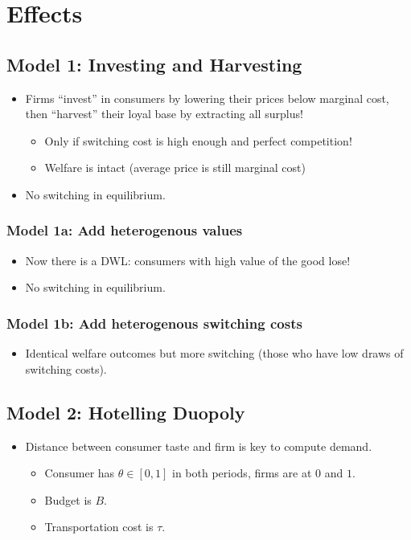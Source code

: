\section{Effects}

\subsection{Model 1: Investing and Harvesting}

\begin{itemize}
\item Firms ``invest'' in consumers by lowering their prices below marginal cost, then ``harvest'' their loyal base by extracting all surplus!
\begin{itemize}
\item Only if switching cost is high enough and perfect competition!
\item Welfare is intact (average price is still marginal cost)
\end{itemize}
\item No switching in equilibrium.
\end{itemize}

\subsubsection{Model 1a: Add heterogenous values}

\begin{itemize}
\item Now there is a DWL: consumers with high value of the good lose!
\item No switching in equilibrium.
\end{itemize}

\subsubsection{Model 1b: Add heterogenous switching costs}

\begin{itemize}
\item Identical welfare outcomes but more switching (those who have low draws of switching costs).
\end{itemize}

\subsection{Model 2: Hotelling Duopoly}

\begin{itemize}
\item Distance between consumer taste and firm is key to compute demand.
\begin{itemize}
\item Consumer has $\theta \in [0, 1]$ in both periods, firms are at $0$ and $1$.
\item Budget is $B$.
\item Transportation cost is $\tau$.
\end{itemize}
\end{itemize}


